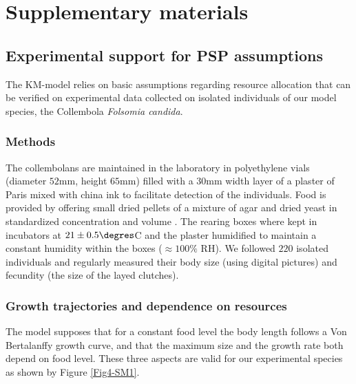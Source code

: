 \section{Supplementary materials}\label{sec:SupMat}
\subsection{Experimental support for PSP assumptions}\label{subsec:SupMat1}

The KM-model relies on basic assumptions regarding resource allocation that can
be verified on experimental data collected on isolated individuals of our model
species, the Collembola \textit{Folsomia candida}.

\subsubsection{Methods}

The collembolans are maintained in the laboratory in polyethylene vials
(diameter $52$mm, height $65$mm) filled with a $30$mm width layer of a plaster
of Paris mixed with china ink to facilitate detection of the individuals. Food
is provided by offering small dried pellets of a mixture of agar and dried yeast
in standardized concentration and volume \autocite{tully2008a}.
The rearing boxes where kept in incubators at $21 \pm 0.5\degres$C and the
plaster humidified to maintain a constant humidity within the boxes ($\approx
100\%$ RH). We followed $220$ isolated individuals and regularly measured their
body size (using digital pictures) and fecundity (the size of the layed
clutches).

\subsubsection{Growth trajectories and dependence on resources}

The model supposes that for a constant food level the body length follows a Von
Bertalanffy growth curve, and that the maximum size and the growth rate both
depend on food level. These three aspects are valid for our experimental species
as shown by Figure \ref{Fig4-SM1}.

